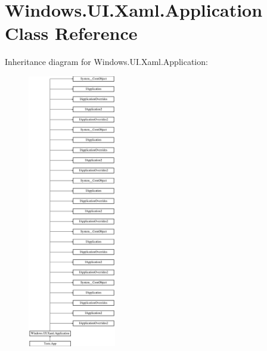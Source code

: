 \hypertarget{class_windows_1_1_u_i_1_1_xaml_1_1_application}{}\section{Windows.\+U\+I.\+Xaml.\+Application Class Reference}
\label{class_windows_1_1_u_i_1_1_xaml_1_1_application}
Inheritance diagram for Windows.\+U\+I.\+Xaml.\+Application\+:\begin{figure}[H]
\begin{center}
\leavevmode
\includegraphics[height=12.000000cm]{class_windows_1_1_u_i_1_1_xaml_1_1_application}
\end{center}
\end{figure}
